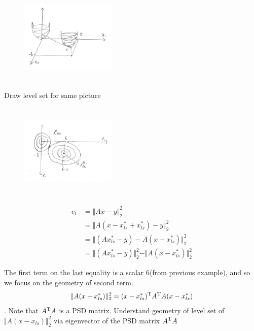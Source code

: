 \begin{figure}
	\centering
	\includegraphics[width=1.8in,height=1.8in]{figures/ch06/ch06-06.jpg}
\end{figure}

\newpage
Draw level set for same picture
\begin{figure}
	\centering
	\includegraphics[width=1.8in,height=1.8in]{figures/ch06/ch06-07.jpg}
\end{figure}

\begin{align*}
c_1
&=\Vert Ax-y\Vert^2_2\\
&=\Vert A(x-x_{ls}^*+x_{ls}^*)-y\Vert^2_2\\
&=\Vert (Ax_{ls}^*-y)-A(x-x_{ls}^*)\Vert^2_2\\
&=\Vert (Ax_{ls}^*-y)\Vert^2_2 - \Vert A(x-x_{ls}^*)\Vert^2_2
\end{align*}

The first term on the last equality is a scalar 6(from previous example), and so we focus on the geometry of second term.
$$\Vert A(x-x_{ls}^*)\Vert^2_2= (x-x_{ls}^*)^{{\rm T}} A^{{\rm T}}A (x-x_{ls}^*)$$. 
Note that $A^{{\rm T}}A$ is a PSD matrix. Understand geometry of level set of $\Vert A(x-x_{ls})\Vert^2_2$ via eigenvector of the PSD matrix $A^{{\rm T}} A$

